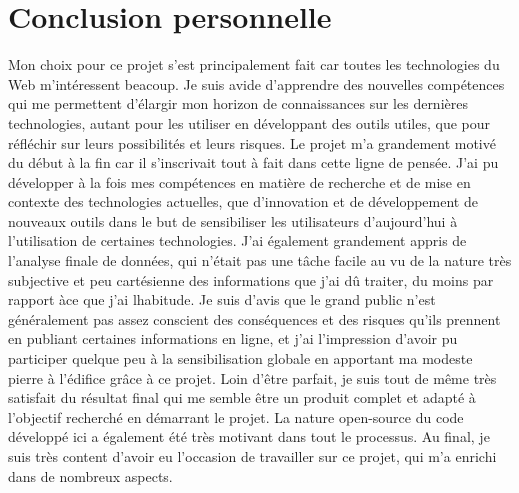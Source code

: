 \section{Conclusion personnelle}

	Mon choix pour ce projet s'est principalement fait car toutes les technologies du Web m'intéressent beacoup. Je suis avide d'apprendre des nouvelles compétences qui me permettent d'élargir mon horizon de connaissances sur les dernières technologies, autant pour les utiliser en développant des outils utiles, que pour réfléchir sur leurs possibilités et leurs risques. Le projet m'a grandement motivé du début à la fin car il s'inscrivait tout à fait dans cette ligne de pensée.
	J'ai pu développer à la fois mes compétences en matière de recherche et de mise en contexte des technologies actuelles, que d'innovation et de développement de nouveaux outils dans le but de sensibiliser les utilisateurs d'aujourd'hui à l'utilisation de certaines technologies. J'ai également grandement appris de l'analyse finale de données, qui n'était pas une tâche facile au vu de la nature très subjective et peu cartésienne des informations que j'ai dû traiter, du moins par rapport àce que j'ai lhabitude.
	Je suis d'avis que le grand public n'est généralement pas assez conscient des conséquences et des risques qu'ils prennent en publiant certaines informations en ligne, et j'ai l'impression d'avoir pu participer quelque peu à la sensibilisation globale en apportant ma modeste pierre à l'édifice grâce à ce projet. Loin d'être parfait, je suis tout de même très satisfait du résultat final qui me semble être un produit complet et adapté à l'objectif recherché en démarrant le projet.
	La nature open-source du code développé ici a également été très motivant dans tout le processus.
	Au final, je suis très content d'avoir eu l'occasion de travailler sur ce projet, qui m'a enrichi dans de nombreux aspects. 